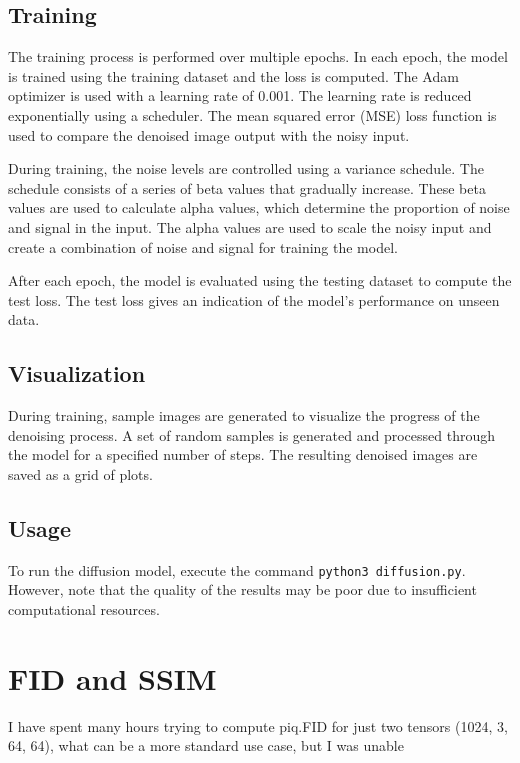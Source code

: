 \documentclass[a4paper]{article}
\begin{document}
\subsection{Training}

The training process is performed over multiple epochs. In each epoch, the model is trained using the training dataset and the loss is computed. The Adam optimizer is used with a learning rate of 0.001. The learning rate is reduced exponentially using a scheduler. The mean squared error (MSE) loss function is used to compare the denoised image output with the noisy input.

During training, the noise levels are controlled using a variance schedule. The schedule consists of a series of beta values that gradually increase. These beta values are used to calculate alpha values, which determine the proportion of noise and signal in the input. The alpha values are used to scale the noisy input and create a combination of noise and signal for training the model.

After each epoch, the model is evaluated using the testing dataset to compute the test loss. The test loss gives an indication of the model's performance on unseen data.

\subsection{Visualization}

During training, sample images are generated to visualize the progress of the denoising process. A set of random samples is generated and processed through the model for a specified number of steps. The resulting denoised images are saved as a grid of plots.

\subsection{Usage}

To run the diffusion model, execute the command \verb|python3 diffusion.py|. However, note that the quality of the results may be poor due to insufficient computational resources.


\section{FID and SSIM}

\huge{I have spent many hours trying to compute piq.FID for just two tensors (1024, 3, 64, 64), what can be a more standard use case, but I was unable}
\end{document}
